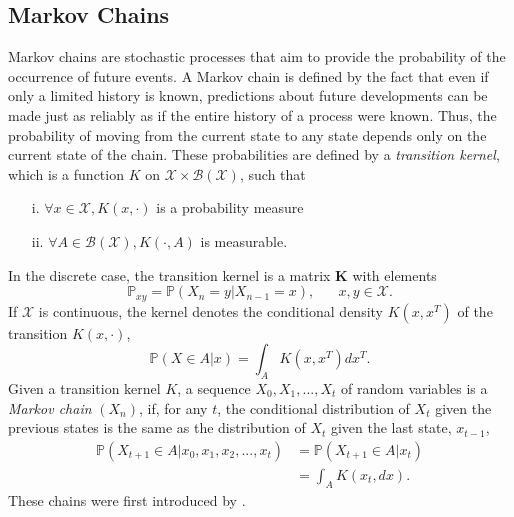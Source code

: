 \subsection{Markov Chains}
Markov chains are stochastic processes that aim to provide the probability of the occurrence of future events. A Markov chain is defined by the fact that even if only a limited history is known, predictions about future developments can be made just as reliably as if the entire history of a process were known. Thus, the probability of moving from the current state to any state depends only on the current state of the chain. These probabilities are defined by a \textit{transition kernel}, which is a function $K$ on $\mathcal{X} \times \mathcal{B}\left(\mathcal{X}\right)$, such that
\begin{itemize}
    \item[i.] $\forall x\in\mathcal{X}, K\left(x, \cdot\right)$ is a probability measure
    \item[ii.] $\forall A\in \mathcal{B}\left(\mathcal{X}\right), K\left(\cdot, A\right)$ is measurable.
\end{itemize}
In the discrete case, the transition kernel is a matrix $\pmb{K}$ with elements
\begin{equation*}
    \mathbb{P}_{xy}=\mathbb{P}\left(X_n=y|X_{n-1}=x\right), \hspace{20pt}x,y\in\mathcal{X}.
\end{equation*}
If $\mathcal{X}$ is continuous, the kernel denotes the conditional density $K\left(x,x^T\right)$ of the transition $K\left(x,\cdot\right)$,
\begin{equation*}
    \mathbb{P}\left(X\in A|x\right)=\int_AK\left(x,x^T\right)dx^T.
\end{equation*}
Given a transition kernel $K$, a sequence $X_0,X_1,...,X_t$ of random variables is a \textit{Markov chain} $\left(X_n\right)$, if, for any $t$, the conditional distribution of $X_t$ given the previous states is the same as the distribution of $X_t$ given the last state, $x_{t-1}$,
\begin{align}
    \mathbb{P}\left(X_{t+1}\in A|x_0,x_1,x_2,...,x_t\right) &= \mathbb{P}\left(X_{t+1}\in A|x_t\right) \nonumber\\
    &= \int_A K\left(x_t, dx\right). 
\end{align}
These chains were first introduced by \cite{markov1906extension}.
